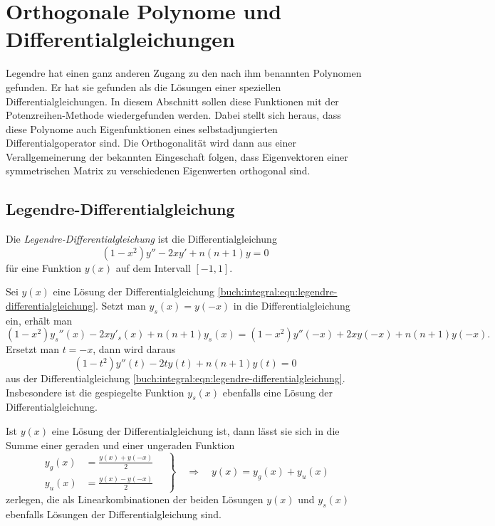 %
%
%
\section{Orthogonale Polynome und Differentialgleichungen
\label{buch:orthogonal:section:orthogonale-polynome-und-dgl}}
Legendre hat einen ganz anderen Zugang zu den nach ihm benannten
Polynomen gefunden.
Er hat sie gefunden als die Lösungen einer speziellen Differentialgleichungen.
In diesem Abschnitt sollen diese Funktionen mit der Potenzreihen-Methode
wiedergefunden werden.
Dabei stellt sich heraus, dass diese Polynome auch Eigenfunktionen eines
selbstadjungierten Differentialgoperator sind.
Die Orthogonalität wird dann aus einer Verallgemeinerung der bekannten
Eingeschaft folgen, dass Eigenvektoren einer symmetrischen Matrix zu 
verschiedenen Eigenwerten orthogonal sind.

%
%
\subsection{Legendre-Differentialgleichung}
Die {\em Legendre-Differentialgleichung} ist die Differentialgleichung
%
%
\begin{equation}
(1-x^2) y'' - 2x y' + n(n+1) y = 0
\label{buch:integral:eqn:legendre-differentialgleichung}
\end{equation}
für eine Funktion $y(x)$ auf dem Intervall $[-1,1]$.

Sei $y(x)$ eine Lösung der Differentialgleichung
\eqref{buch:integral:eqn:legendre-differentialgleichung}.
Setzt man $y_s(x)=y(-x)$ in die Differentialgleichung ein, erhält
man
\[
(1-x^2)y_s''(x) - 2x y'_s(x) + n(n+1)y_s(x)
=
(1-x^2)y''(-x) +2x y(-x) +n(n+1)y(-x).
\]
Ersetzt man $t=-x$, dann wird daraus
\[
(1-t^2)y''(t) -2t y(t) + n(n+1) y(t) = 0
\]
aus der Differentialgleichung
\eqref{buch:integral:eqn:legendre-differentialgleichung}.
Insbesondere ist die gespiegelte Funktion $y_s(x)$ ebenfalls
eine Lösung der Differentialgleichung.

Ist $y(x)$ eine Lösung der Differentialgleichung ist, dann lässt
sie sich in die Summe einer geraden und einer ungeraden Funktion
\[
\left.
\begin{aligned}
y_g(x) &= \frac{y(x)+y(-x)}{2}\\
y_u(x) &= \frac{y(x)-y(-x)}{2}
\end{aligned}
\quad
\right\}
\quad
\Rightarrow
\quad
y(x) = y_g(x) + y_u(x)
\]
zerlegen, die als Linearkombinationen der beiden Lösungen
$y(x)$ und $y_s(x)$ ebenfalls Lösungen der Differentialgleichung
sind.

